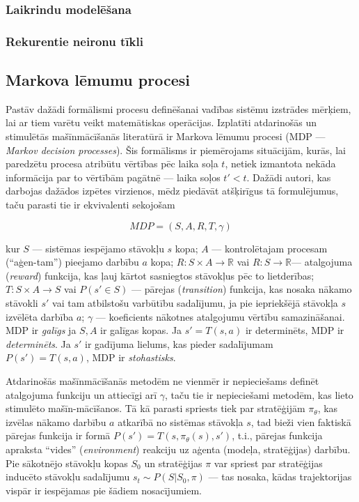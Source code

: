 \documentclass[12pt, a4paper]{article}
\numberwithin{equation}{section} %
\begin{document}
\subsubsection{Laikrindu modelēšana}

\subsubsection{Rekurentie neironu tīkli}

\subsection{Markova lēmumu procesi}

Pastāv dažādi formālismi procesu definēšanai vadības sistēmu izstrādes mērķiem, lai ar tiem varētu veikt matemātiskas operācijas. Izplatīti atdarinošās un stimulētās mašīnmācīšanās literatūrā ir Markova lēmumu procesi (MDP --- \textit{Markov decision processes}). Šis formālisms ir piemērojams  situācijām, kurās, lai paredzētu procesa atribūtu vērtības pēc laika soļa $t$, netiek izmantota nekāda informācija par to vērtībām pagātnē --- laika soļos $t' < t$. Dažādi autori, kas darbojas dažādos izpētes virzienos, mēdz piedāvāt atšķirīgus tā formulējumus, taču parasti tie ir ekvivalenti sekojošam \cite{attia2018global}

\begin{equation} 
    MDP = (S,A,R,T, \gamma)
\end{equation}

kur $S$ --- sistēmas iespējamo stāvokļu $s$ kopa; $A$ --- kontrolētajam procesam (``aģen-tam'') pieejamo darbību $a$ kopa; $R: S \times A \rightarrow \mathbb{R}$ vai $R: S \rightarrow \mathbb{R}$--- atalgojuma (\textit{reward}) funkcija, kas ļauj kārtot sasniegtos stāvokļus pēc to lietderības; $T: S \times A \rightarrow S$ vai $P(s' \in S)$ --- pārejas (\textit{transition}) funkcija, kas nosaka nākamo stāvokli $s'$ vai tam atbilstošu varbūtību sadalījumu, ja pie iepriekšējā stāvokļa $s$ izvēlēta darbība $a$; $\gamma$ --- koeficients nākotnes atalgojumu vērtību samazināšanai. MDP ir \textit{galīgs} ja $S,A$ ir galīgas kopas. Ja $s' = T(s,a)$ ir determinēts, MDP ir \textit{determinēts}. Ja $s'$ ir gadījuma lielums, kas pieder sadalījumam $P(s')=T(s,a)$, MDP ir \textit{stohastisks}.

Atdarinošās mašīnmācīšanās metodēm ne vienmēr ir nepieciešams definēt atalgojuma funkciju un attiecīgi arī $\gamma$, taču tie ir nepieciešami metodēm, kas lieto stimulēto mašīn-mācīšanos. Tā kā parasti spriests tiek par stratēģijām $\pi_{\theta}$, kas izvēlas nākamo darbību $a$ atkarībā no sistēmas stāvokļa $s$, tad bieži vien faktiskā pārejas funkcija ir formā $P(s') = T(s, \pi_{\theta}(s), s')$, t.i., pārejas funkcija apraksta ``vides'' (\textit{environment}) reakciju uz aģenta (modeļa, stratēģijas) darbību. Pie sākotnējo stāvokļu kopas $S_0$ un stratēģijas $\pi$ var spriest par stratēģijas inducēto stāvokļu sadalījumu $s_t \sim P(S \vert S_0, \pi)$ --- tas nosaka, kādas trajektorijas vispār ir iespējamas pie šādiem nosacījumiem. 
\end{document}
